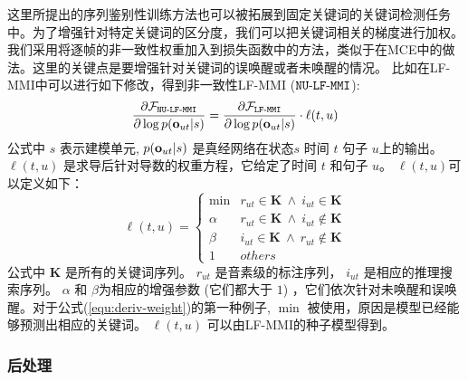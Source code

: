 这里所提出的序列鉴别性训练方法也可以被拓展到固定关键词的关键词检测任务中。为了增强针对特定关键词的区分度，我们可以把关键词相关的梯度进行加权。我们采用将逐帧的非一致性权重加入到损失函数中的方法，类似于\cite{meng2016non}在MCE中的做法。这里的关键点是要增强针对关键词的误唤醒或者未唤醒的情况。
比如在LF-MMI中可以进行如下修改，得到非一致性LF-MMI ($\tt{NU\text{-}LF\text{-}MMI}$):
\begin{equation}
\label{equ:kws-nummi}
\begin{split}
\frac{\partial \mathcal{F}_{\tt{NU\text{-}LF\text{-}MMI}}}{\partial\log p({\bf o}_{ut}|s)}
=\frac{\partial \mathcal{F}_{\tt{LF\text{-}MMI}}}{\partial\log p({\bf o}_{ut}|s)}\cdot  \ell(t,u)
\end{split}
\end{equation}
公式中 $s$ 表示建模单元, $p({\bf o}_{ut}|s)$ 是真经网络在状态$s$ 时间 $t$ 句子 $u$上的输出。
$\ell(t,u)$ 是求导后针对导数的权重方程，它给定了时间 $t$ 和句子 $u$。 $\ell(t,u)$可以定义如下：
\begin{equation}
\label{equ:deriv-weight}
\ell(t,u)=
\begin{cases}
\mathop{\min(\alpha,\beta)}& r_{ut}\in \mathbf{K}\ \land\ i_{ut}\in \mathbf{K}\\
\alpha& r_{ut}\in \mathbf{K}\ \land\ i_{ut}\notin \mathbf{K}\\
\beta& i_{ut}\in \mathbf{K}\ \land\ r_{ut}\notin \mathbf{K}\\
1& others
\end{cases}
\end{equation}
公式中 $\mathbf{K}$ 是所有的关键词序列。 $r_{ut}$   是音素级的标注序列， $i_{ut}$ 是相应的推理搜索序列。 $\alpha$ 和 $\beta$为相应的增强参数 (它们都大于 $1$) ，它们依次针对未唤醒和误唤醒。对于公式(\ref{equ:deriv-weight})的第一种例子, $\mathop{\min(\alpha,\beta)}$ 被使用，原因是模型已经能够预测出相应的关键词。 $\ell(t,u)$ 可以由LF-MMI的种子模型得到。

\subsubsection{后处理}
\label{Sec:post-process}


